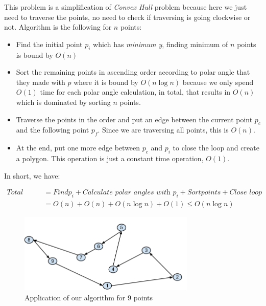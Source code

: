 This problem is a simplification of  \textit{Convex Hull} problem because here we just need to traverse the points, no need to check if traversing is going clockwise or not. Algorithm is the following for $n$ points:
\begin{itemize}
  \item Find the initial point $p_i$ which has \textit{minimum y}, finding minimum of $n$ points is bound by $O(n)$
  \item Sort the remaining points in ascending order according to polar angle that they made with $p$ where it is bound by $O(n \log n)$ because we only spend $O(1)$ time for each  polar angle calculation, in total, that results in $O(n)$ which is dominated by sorting $n$ points.
  \item Traverse the points in the order and put an edge between the current point $p_c$ and the following point $p_f$. Since we are traversing all points, this is $O(n)$.
  \item At the end, put one more edge between $p_c$ and $p_i$ to close the loop and create a polygon. This operation is just a constant time operation, $O(1)$.
\end{itemize}

In short, we have:

\begin{align*}
  \textit{Total Cost} &= Find p_i + \textit{Calculate polar angles with } p_i + Sort points + \textit{Close loop} \\
                      &= O(n) + O(n) + O(n \log n) + O(1) \leq O(n \log n)
\end{align*}

\begin{figure}[ht]
  \centering
  \includegraphics[width=0.75\textwidth]{prob4}
  \caption{Application of our algorithm for 9 points}
  \label{fig:prob4}
\end{figure}